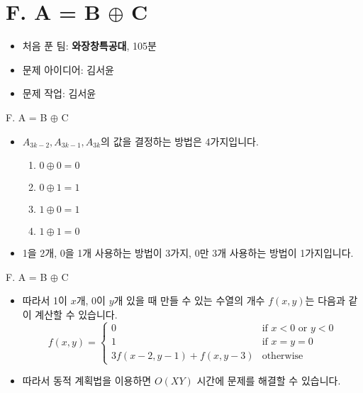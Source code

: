\def\probno{F}
\def\probtitle{A = B $\oplus$ C}

\section{\probno{}. \probtitle{}}

\begin{frame} %
    \sectiontitle{\probno{}}{\probtitle{}}
    \begin{itemize}
        \item 처음 푼 팀: \textbf{와장창특공대}, 105분
        \item 문제 아이디어: 김서윤
        \item 문제 작업: 김서윤
    \end{itemize}
\end{frame}

\begin{frame}{\probno{}. \probtitle{}}
    \begin{itemize}
        \item $A_{3k-2}, A_{3k-1}, A_{3k}$의 값을 결정하는 방법은 4가지입니다.
        \begin{enumerate}
            \item $0 \oplus 0 = 0$
            \item $0 \oplus 1 = 1$
            \item $1 \oplus 0 = 1$
            \item $1 \oplus 1 = 0$
        \end{enumerate}
        \vspace{3mm}
        \item 1을 2개, 0을 1개 사용하는 방법이 3가지, 0만 3개 사용하는 방법이 1가지입니다.
    \end{itemize}
\end{frame}

\begin{frame}{\probno{}. \probtitle{}}
    \begin{itemize}
        \item 따라서 1이 $x$개, 0이 $y$개 있을 때 만들 수 있는 수열의 개수 $f(x, y)$는 다음과 같이 계산할 수 있습니다.
        $$f(x, y) = \begin{cases}
        0 & \text{if } x < 0 \text{ or } y < 0 \\
        1 & \text{if } x = y = 0 \\
        3f(x-2, y-1) + f(x, y-3) & \text{otherwise}
        \end{cases}$$
        \item 따라서 동적 계획법을 이용하면 $O(XY)$ 시간에 문제를 해결할 수 있습니다.
    \end{itemize}
\end{frame}